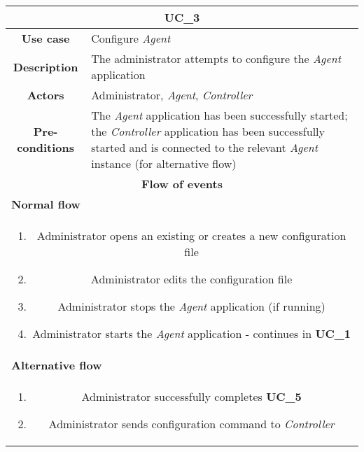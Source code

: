             \vspace{0.5cm}
            \noindent
            \begin{longtable}{ |c|p{11.8cm}| }
                \hline
                \multicolumn{2}{|c|}{\cellcolor{lime} \textbf{UC\_3}}\\ \hline
                \cellcolor[gray]{0.9} \textbf{Use case} & Configure \textit{Agent}\\ \hline
                \cellcolor[gray]{0.9} \textbf{Description} & The administrator attempts to configure the \textit{Agent} application\\ \hline
                \cellcolor[gray]{0.9} \textbf{Actors} & Administrator, \textit{Agent}, \textit{Controller}\\ \hline
                \cellcolor[gray]{0.9} \textbf{Pre-conditions} & The \textit{Agent} application has been successfully started; the \textit{Controller} application has been successfully started and is connected to the relevant \textit{Agent} instance (for alternative flow)\\ \hline
                \multicolumn{2}{|c|}{\cellcolor[gray]{0.9} \textbf{Flow of events}}\\ \hline
                \multicolumn{2}{|l|}{\cellcolor[gray]{0.9} \textbf{Normal flow}}\\ \hline
                \multicolumn{2}{|p{14cm}|}{
                    \begin{enumerate}
                        \item Administrator opens an existing or creates a new configuration file
                        \item Administrator edits the configuration file
                        \item Administrator stops the \textit{Agent} application (if running)
                        \item Administrator starts the \textit{Agent} application - continues in \textbf{UC\_1}
                    \end{enumerate}
                }\\ \hline
                \multicolumn{2}{|l|}{\cellcolor[gray]{0.9} \textbf{Alternative flow}}\\ \hline
                \multicolumn{2}{|p{14cm}|}{
                    \begin{enumerate}
                        \item Administrator successfully completes \textbf{UC\_5}
                        \item Administrator sends configuration command to \textit{Controller}

\end{enumerate}}
\end{longtable}
